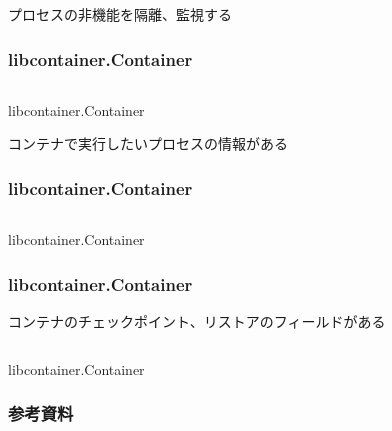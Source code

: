 \documentclass[unicode, 14pt, aspectratio=169]{beamer}
\begin{document}
\begin{frame}
  プロセスの非機能を隔離、監視\supercite{rdt}する
  \frametitle{libcontainer.Container}
  \begin{center}
    \inputminted{go}{code/container2.go}
    libcontainer.Container\supercite{libcontainer}
  \end{center}
\end{frame}
\begin{frame}
  コンテナで実行したいプロセスの情報がある
  \frametitle{libcontainer.Container}
  \begin{center}
    \inputminted{go}{code/container3.go}
    libcontainer.Container\supercite{libcontainer}
  \end{center}
\end{frame}
\begin{frame}[t]
  \frametitle{libcontainer.Container}
  コンテナのチェックポイント、リストアのフィールドがある\supercite{criu}
  \begin{center}
    \inputminted{go}{code/container4.go}
    libcontainer.Container\supercite{libcontainer}
  \end{center}
\end{frame}
\begin{frame}[allowframebreaks]
  \frametitle{参考資料}
  \printbibliography
  \nocite{*} 
\end{frame}
\end{document}
